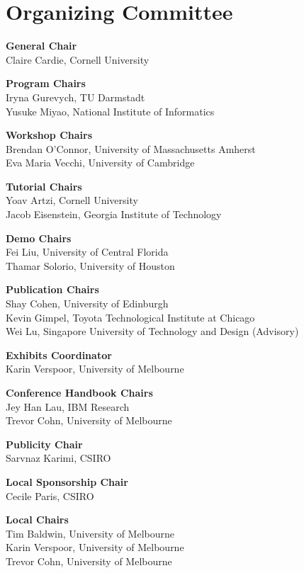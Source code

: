 \markboth{}{} %
\markright{}{} %

\section{Organizing Committee}{}

\setlength{\parindent}{0pt}

{\bf General Chair} \\
Claire Cardie, Cornell University

{\bf Program Chairs} \\
Iryna Gurevych, TU Darmstadt\\
Yusuke Miyao, National Institute of Informatics

{\bf Workshop Chairs} \\
Brendan O’Connor, University of Massachusetts Amherst\\
Eva Maria Vecchi, University of Cambridge

{\bf Tutorial Chairs} \\
Yoav Artzi, Cornell University\\
Jacob Eisenstein, Georgia Institute of Technology

{\bf Demo Chairs} \\
Fei Liu, University of Central Florida\\
Thamar Solorio, University of Houston

{\bf Publication Chairs} \\
Shay Cohen, University of Edinburgh\\
Kevin Gimpel, Toyota Technological Institute at Chicago\\
Wei Lu, Singapore University of Technology and Design (Advisory)

{\bf Exhibits Coordinator} \\
Karin Verspoor, University of Melbourne

{\bf Conference Handbook Chairs} \\
Jey Han Lau, IBM Research\\
Trevor Cohn, University of Melbourne

{\bf Publicity Chair} \\
Sarvnaz Karimi, CSIRO

{\bf Local Sponsorship Chair} \\
Cecile Paris, CSIRO

{\bf Local Chairs} \\
Tim Baldwin, University of Melbourne\\
Karin Verspoor, University of Melbourne\\
Trevor Cohn, University of Melbourne

